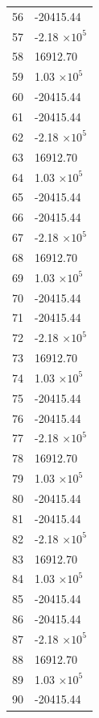 \documentclass[a4paper,11pt]{article}
\begin{document}
\begin{center}
\begin{longtable}{|R{1.5cm}|R{2.6cm}|}
   56 &    -20415.44 \\
   57 &        -2.18 $\times 10^{           5}$ \\
   58 &     16912.70 \\
   59 &         1.03 $\times 10^{           5}$ \\
   60 &    -20415.44 \\
   61 &    -20415.44 \\
   62 &        -2.18 $\times 10^{           5}$ \\
   63 &     16912.70 \\
   64 &         1.03 $\times 10^{           5}$ \\
   65 &    -20415.44 \\
   66 &    -20415.44 \\
   67 &        -2.18 $\times 10^{           5}$ \\
   68 &     16912.70 \\
   69 &         1.03 $\times 10^{           5}$ \\
   70 &    -20415.44 \\
   71 &    -20415.44 \\
   72 &        -2.18 $\times 10^{           5}$ \\
   73 &     16912.70 \\
   74 &         1.03 $\times 10^{           5}$ \\
   75 &    -20415.44 \\
   76 &    -20415.44 \\
   77 &        -2.18 $\times 10^{           5}$ \\
   78 &     16912.70 \\
   79 &         1.03 $\times 10^{           5}$ \\
   80 &    -20415.44 \\
   81 &    -20415.44 \\
   82 &        -2.18 $\times 10^{           5}$ \\
   83 &     16912.70 \\
   84 &         1.03 $\times 10^{           5}$ \\
   85 &    -20415.44 \\
   86 &    -20415.44 \\
   87 &        -2.18 $\times 10^{           5}$ \\
   88 &     16912.70 \\
   89 &         1.03 $\times 10^{           5}$ \\
   90 &    -20415.44 \\

\end{longtable}
\end{center}
\end{document}
